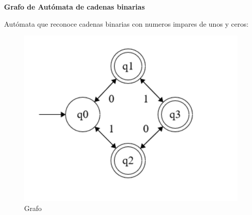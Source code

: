 \documentclass{article}
\begin{document}
\pagebreak
\begin{center}
	\textbf{Grafo de Autómata de cadenas binarias}
	
	Autómata que reconoce cadenas binarias con numeros impares de unos y ceros:
	\begin{figure}[h]
		\centering

		\includegraphics[width=15cm]{grafo}
		\caption{Grafo}
	\end{figure}	
\end{center}
\end{document}
